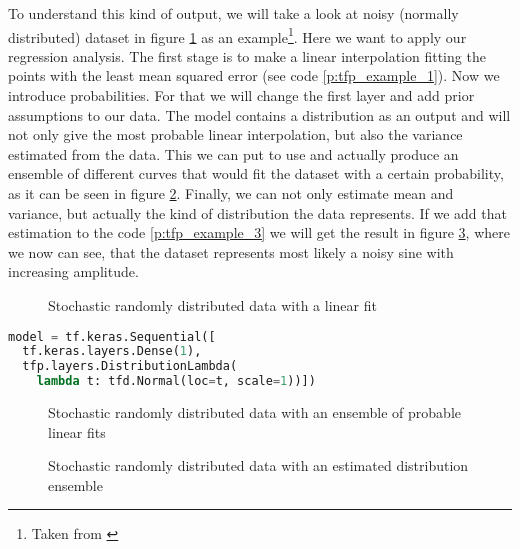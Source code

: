 		To understand this kind of output, we will take a look at noisy (normally distributed) dataset in figure \ref{f:tfp_example_1} as an example\footnote{Taken from \cite{tf-prop-example}}. Here we want to apply our regression analysis. The first stage is to make a linear interpolation fitting the points with the least mean squared error (see code \ref{p:tfp_example_1}). \newline
		Now we introduce probabilities. For that we will change the first layer and add prior assumptions to our data. The model contains a distribution as an output and will not only give the most probable linear interpolation, but also the variance estimated from the data. This we can put to use and actually produce an ensemble of different curves that would fit the dataset with a certain probability, as it can be seen in figure \ref{f:tfp_example_2}. \newline
		Finally, we can not only estimate mean and variance, but actually the kind of distribution the data represents. If we add that estimation to the code \ref{p:tfp_example_3} we will get the result in figure \ref{f:tfp_example_3}, where we now can see, that the dataset represents most likely a noisy sine with increasing amplitude.
		
		\begin{figure}[htb]
		\centering
		
		\caption{Stochastic randomly distributed data with a linear fit}
		\label{f:tfp_example_1}
		\end{figure}

		\begin{lstlisting}[caption={Linear Fit}, language=python, label={p:tfp_example_1}]
model = tf.keras.Sequential([
  tf.keras.layers.Dense(1),
  tfp.layers.DistributionLambda(
    lambda t: tfd.Normal(loc=t, scale=1))])		
		\end{lstlisting}
		
		\begin{figure}[htb]
		\centering
		
		\caption{Stochastic randomly distributed data with an ensemble of probable linear fits}
		\label{f:tfp_example_2}
		\end{figure}
		
		\begin{figure}[htb]
		\centering
		
		\caption{Stochastic randomly distributed data with an estimated distribution ensemble}
		\label{f:tfp_example_3}
		\end{figure}
		
